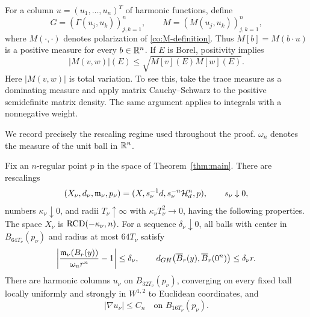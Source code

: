 For a column \(u=(u_1,\ldots,u_n)^T\) of harmonic functions, define
\begin{equation}\label{co:G-M-matrix}
 G=(\Gamma(u_j,u_k))_{j,k=1}^n,
 \qquad M=(M(u_j,u_k))_{j,k=1}^n,
\end{equation}
where \(M(\cdot,\cdot)\) denotes polarization of
\eqref{co:M-definition}.  Thus \(M[b]=M(b\cdot u)\) is a positive
measure for every \(b\in\mathbb R^n\).  If \(E\) is Borel, positivity
implies
\begin{equation}\label{co:matrix-measure-cs}
 |M(v,w)|(E)\le \sqrt{M[v](E)M[w](E)}.
\end{equation}
Here \(|M(v,w)|\) is total variation.  To see this, take the trace
measure as a dominating measure and apply matrix Cauchy--Schwarz
to the positive semidefinite matrix density.  The same argument
applies to integrals with a nonnegative weight.

We record precisely the rescaling regime used throughout the proof.
\(\omega_n\) denotes the measure of the unit ball in \(\mathbb R^n\).

\begin{lemma}\label{co:flat-setup}
Fix an \(n\)-regular point \(p\) in the space of
Theorem~\ref{thm:main}.  There are rescalings
\[
 (X_\nu,d_\nu,\mathfrak m_\nu,p_\nu)
 =(X,s_\nu^{-1}d,s_\nu^{-n}\mathcal H_d^n,p),
 \qquad s_\nu\downarrow0,
\]
numbers \(\kappa_\nu\downarrow0\), and radii \(T_\nu\uparrow\infty\)
with \(\kappa_\nu T_\nu^2\to0\), having the following properties.
The space \(X_\nu\) is \(\mathrm{RCD}(-\kappa_\nu,n)\).  For a sequence
\(\delta_\nu\downarrow0\), all balls with center in
\(B_{64T_\nu}(p_\nu)\) and radius at most \(64T_\nu\) satisfy
\begin{equation}\label{co:uniform-flatness}
 \left|\frac{\mathfrak m_\nu(B_r(y))}{\omega_n r^n}-1\right|
 \le\delta_\nu,
 \qquad
 d_{GH}\bigl(\overline B_r(y),\overline B_r(0^n)\bigr)
 \le\delta_\nu r.
\end{equation}
There are harmonic columns \(u_\nu\) on
\(B_{32T_\nu}(p_\nu)\), converging on every fixed ball locally
uniformly and strongly in \(W^{1,2}\) to Euclidean coordinates, and
\begin{equation}\label{co:original-gradient-bound}
 |\nabla u_\nu|\le C_n
 \quad\text{on }B_{16T_\nu}(p_\nu).
\end{equation}
\end{lemma}

